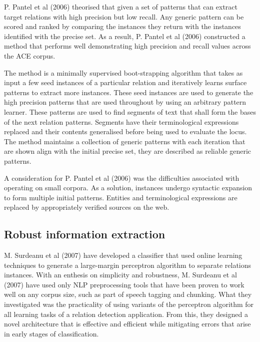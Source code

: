 \documentclass{ecmm427_assignment}
\begin{document}
P. Pantel et al (2006) theorised that given a set of patterns that can extract target relations with high precision but low recall. Any generic pattern can be scored and ranked by comparing the instances they return with the instances identified with the precise set. As a result, P. Pantel et al (2006) constructed a method that performs well demonstrating high precision and recall values across the ACE corpus.

The method is a minimally supervised boot-strapping algorithm that takes as input a few seed instances of a particular relation and iteratively learns surface patterns to extract more instances. These seed instances are used to generate the high precision patterns that are used throughout by using an arbitrary pattern learner. These patterns are used to find segments of text that shall form the bases of the next relation patterns. Segments have their terminological expressions replaced and their contents generalised before being used to evaluate the locus. The method maintains a collection of generic patterns with each iteration that are shown align with the initial precise set, they are described as reliable generic patterns.

A consideration for P. Pantel et al (2006) was the difficulties associated with operating on small corpora. As a solution, instances undergo syntactic expansion to form multiple initial patterns. Entities and terminological expressions are replaced by appropriately verified sources on the web.
 

\subsection{Robust information extraction}

M. Surdeanu et al (2007) have developed a classifier that used online learning techniques to generate a large-margin perceptron algorithm to separate relations instances. With an enthesis on simplicity and robustness, M. Surdeanu et al (2007) have used only NLP preprocessing tools that have been proven to work well on any corpus size, such as part of speech tagging and chunking. What they investigated was the practicality of using variants of the perceptron algorithm for all learning tasks of a relation detection application. From this, they designed a novel architecture that is effective and efficient while mitigating errors that arise in early stages of classification. 
\end{document}

